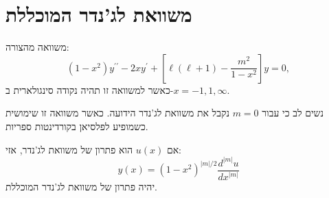 \documentclass{tstextbook}
\begin{document}
\section{משוואת לג'נדר המוכללת}

\begin{definition}
משוואה מהצורה:
$$(1-x^{2})y^{\prime\prime}-2x y^{\prime}+\left[\ell(\ell+1)-\frac{m^{2}}{1-x^{2}}\right]y=0,$$
כאשר למשוואה זו תהיה נקודה סינגולארית ב-\(x=-1,1,\infty\).

\end{definition}
\begin{remark}
נשים לב כי עבור \(m=0\) נקבל את משוואת לג'נדר הידועה. כאשר משוואה זו שימושית כשמופיע לפלסיאן בקורדינטות ספריות.

\end{remark}
\begin{proposition}
אם \(u(x)\) הוא פתרון של משוואת לג'נדר, אזי:
$$y(x)=(1-x^{2})^{|m|/2}\frac{d^{|m|}u}{d x^{|m|}}$$
יהיה פתרון של משוואת לג'נדר המוכללת.

\end{proposition}
\end{document}
